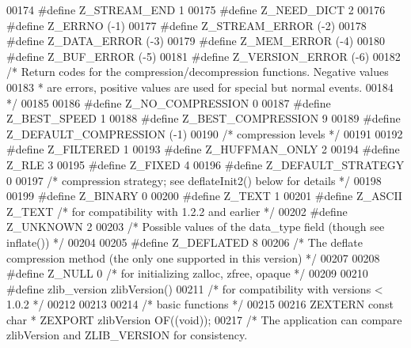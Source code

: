 \begin{DoxyCode}
00174 \textcolor{preprocessor}{#define Z\_STREAM\_END    1}
00175 \textcolor{preprocessor}{#define Z\_NEED\_DICT     2}
00176 \textcolor{preprocessor}{#define Z\_ERRNO        (-1)}
00177 \textcolor{preprocessor}{#define Z\_STREAM\_ERROR (-2)}
00178 \textcolor{preprocessor}{#define Z\_DATA\_ERROR   (-3)}
00179 \textcolor{preprocessor}{#define Z\_MEM\_ERROR    (-4)}
00180 \textcolor{preprocessor}{#define Z\_BUF\_ERROR    (-5)}
00181 \textcolor{preprocessor}{#define Z\_VERSION\_ERROR (-6)}
00182 \textcolor{comment}{/* Return codes for the compression/decompression functions. Negative values}
00183 \textcolor{comment}{ * are errors, positive values are used for special but normal events.}
00184 \textcolor{comment}{ */}
00185 
00186 \textcolor{preprocessor}{#define Z\_NO\_COMPRESSION         0}
00187 \textcolor{preprocessor}{#define Z\_BEST\_SPEED             1}
00188 \textcolor{preprocessor}{#define Z\_BEST\_COMPRESSION       9}
00189 \textcolor{preprocessor}{#define Z\_DEFAULT\_COMPRESSION  (-1)}
00190 \textcolor{comment}{/* compression levels */}
00191 
00192 \textcolor{preprocessor}{#define Z\_FILTERED            1}
00193 \textcolor{preprocessor}{#define Z\_HUFFMAN\_ONLY        2}
00194 \textcolor{preprocessor}{#define Z\_RLE                 3}
00195 \textcolor{preprocessor}{#define Z\_FIXED               4}
00196 \textcolor{preprocessor}{#define Z\_DEFAULT\_STRATEGY    0}
00197 \textcolor{comment}{/* compression strategy; see deflateInit2() below for details */}
00198 
00199 \textcolor{preprocessor}{#define Z\_BINARY   0}
00200 \textcolor{preprocessor}{#define Z\_TEXT     1}
00201 \textcolor{preprocessor}{#define Z\_ASCII    Z\_TEXT   }\textcolor{comment}{/* for compatibility with 1.2.2 and earlier */}\textcolor{preprocessor}{}
00202 \textcolor{preprocessor}{#define Z\_UNKNOWN  2}
00203 \textcolor{comment}{/* Possible values of the data\_type field (though see inflate()) */}
00204 
00205 \textcolor{preprocessor}{#define Z\_DEFLATED   8}
00206 \textcolor{comment}{/* The deflate compression method (the only one supported in this version) */}
00207 
00208 \textcolor{preprocessor}{#define Z\_NULL  0  }\textcolor{comment}{/* for initializing zalloc, zfree, opaque */}\textcolor{preprocessor}{}
00209 
00210 \textcolor{preprocessor}{#define zlib\_version zlibVersion()}
00211 \textcolor{comment}{/* for compatibility with versions < 1.0.2 */}
00212 
00213 
00214                         \textcolor{comment}{/* basic functions */}
00215 
00216 ZEXTERN \textcolor{keyword}{const} \textcolor{keywordtype}{char} * ZEXPORT zlibVersion OF((\textcolor{keywordtype}{void}));
00217 \textcolor{comment}{/* The application can compare zlibVersion and ZLIB\_VERSION for consistency.}

\end{DoxyCode}
